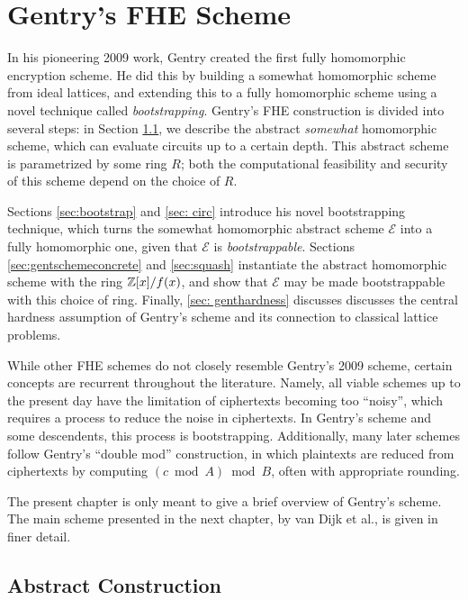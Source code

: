\chapter{Gentry's FHE Scheme} \label{chap:gentry} %
In his pioneering 2009 work, Gentry created the first fully homomorphic encryption scheme. He did this by building a somewhat homomorphic scheme from ideal lattices, and extending this to a fully homomorphic scheme using a novel technique called \emph{bootstrapping}. Gentry's FHE construction is divided into several steps: in Section \ref{sec:gentschemeabstract}, we describe the abstract \emph{somewhat} homomorphic scheme, which can evaluate circuits up to a certain depth. This abstract scheme is parametrized by some ring $R$; both the computational feasibility and security of this scheme depend on the choice of $R$.

Sections \ref{sec:bootstrap} and \ref{sec: circ} introduce his novel bootstrapping technique, which turns the somewhat homomorphic abstract scheme $\mathcal{E}$ into a fully homomorphic one, given that $\mathcal{E}$ is \emph{bootstrappable}. Sections \ref{sec:gentschemeconcrete} and \ref{sec:squash} instantiate the abstract homomorphic scheme with the ring $\mathbb{Z}[x] / f(x)$, and show that $\mathcal{E}$ may be made bootstrappable with this choice of ring. Finally, \ref{sec: genthardness} discusses discusses the central hardness assumption of Gentry's scheme and its connection to classical lattice problems.


While other FHE schemes do not closely resemble Gentry's 2009 scheme, certain concepts are recurrent throughout the literature. Namely, all viable schemes up to the present day have the limitation of ciphertexts becoming too ``noisy'', which requires a process to reduce the noise in ciphertexts. In Gentry's scheme and some descendents, this process is bootstrapping. Additionally, many later schemes follow Gentry's ``double mod'' construction, in which plaintexts are reduced from ciphertexts by computing $(c \bmod A) \bmod B$, often with appropriate rounding.

The present chapter is only meant to give a brief overview of Gentry's scheme. The main scheme presented in the next chapter, by van Dijk et al., is given in finer detail.


\newpage


\section{Abstract Construction}
\label{sec:gentschemeabstract}
